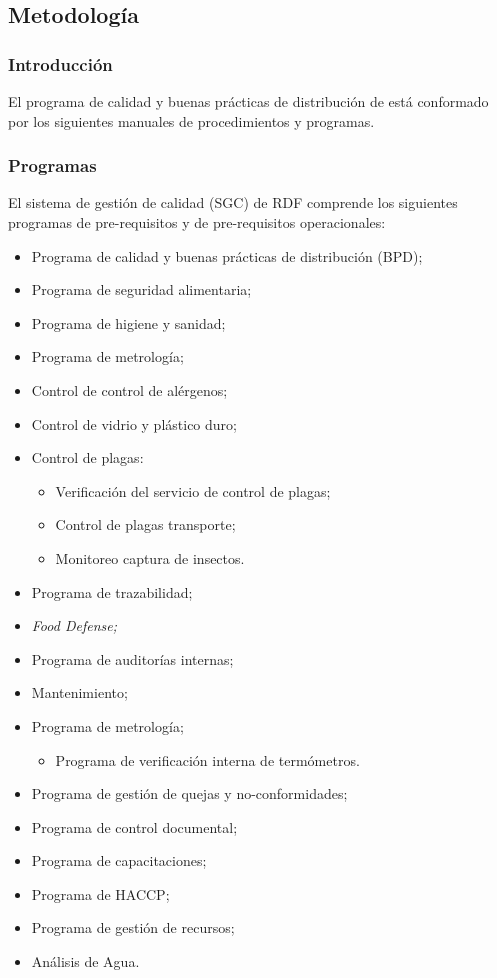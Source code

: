 \subsection{Metodología}

\subsubsection{Introducción}

El programa de calidad y buenas prácticas de distribución de  está conformado por los siguientes manuales de procedimientos y programas.

\subsubsection{Programas}
El sistema de gestión de calidad (SGC) de RDF comprende los siguientes programas de pre-requisitos y de pre-requisitos operacionales:
\begin{itemize}
	\item Programa de calidad y buenas prácticas de distribución (BPD);
	\item Programa de seguridad alimentaria;
	\item Programa de higiene y sanidad;
	\item Programa de metrología;
	\item Control de control de alérgenos;
	\item Control de vidrio y plástico duro;
	\item Control de plagas:
	\begin{itemize}
		\item Verificación del servicio de control de plagas;
		\item Control de plagas transporte;
		\item Monitoreo captura de insectos.
	\end{itemize}
	\item Programa de trazabilidad;
	\item \emph{Food Defense;}
	\item Programa de auditorías internas;
	\item Mantenimiento;
	\item Programa de metrología;
	\begin{itemize}
		\item Programa de verificación interna de termómetros.
	\end{itemize}
	\item Programa de gestión de quejas y no-conformidades;
	\item Programa de control documental;
	\item Programa de capacitaciones;
	\item Programa de \gls{HACCP};
	\item Programa de gestión de recursos;
	\item Análisis de Agua.
\end{itemize}


